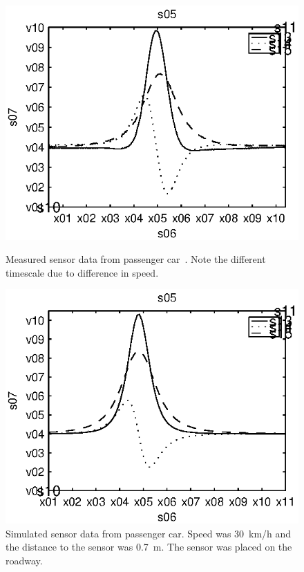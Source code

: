 \begin{subfigures}
\begin{figure}[thb]
 \centering
 \begin{minipage}{0.45\linewidth}
 	\centering
 	
	\includegraphics[width=1\linewidth]{images/realdata}
  	\caption[Measured sensor data from passenger car]{Measured sensor data from passenger car~\cite{imego2007}. Note the different timescale due to difference in speed.\\}
  	\label{fig:realdata}
 \end{minipage} \hfill
 \begin{minipage}{0.45\linewidth}
 	\centering
 	
  	\includegraphics[width=1\linewidth]{images/simdata}
  	\caption[Simulated sensor data from passenger car]{Simulated sensor data from passenger car. Speed was 30~km/h and the distance to the sensor was 0.7~m. The sensor was placed on the roadway.}
  	\label{fig:simdata}
 \end{minipage}
\end{figure}
\end{subfigures}
